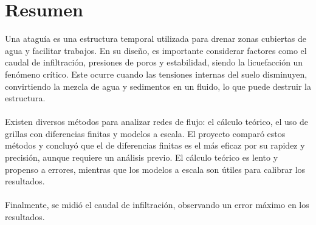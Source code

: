 \section*{Resumen}
Una ataguía es una estructura temporal utilizada para drenar zonas cubiertas de agua y facilitar trabajos. En su diseño, es importante considerar factores como el caudal de infiltración, presiones de poros y estabilidad, siendo la licuefacción un fenómeno crítico. Este ocurre cuando las tensiones internas del suelo disminuyen, convirtiendo la mezcla de agua y sedimentos en un fluido, lo que puede destruir la estructura.
\\ \\
Existen diversos métodos para analizar redes de flujo: el cálculo teórico, el uso de grillas con diferencias finitas y modelos a escala. El proyecto comparó estos métodos y concluyó que el de diferencias finitas es el más eficaz por su rapidez y precisión, aunque requiere un análisis previo. El cálculo teórico es lento y propenso a errores, mientras que los modelos a escala son útiles para calibrar los resultados.
\\ \\
Finalmente, se midió el caudal de infiltración, observando un error máximo en los resultados.